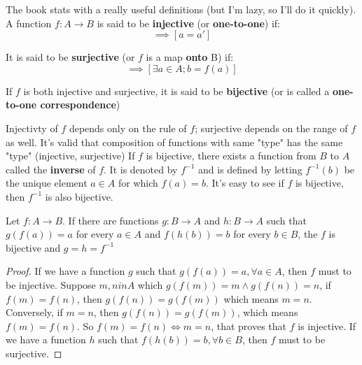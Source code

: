 The book stats with a really useful definitions (but I'm lazy, so I'll do it quickly). A function $f: A \to B$ is said to be \textbf{injective} (or \textbf{one-to-one}) if:
\begin{equation}
  [f(a) = f(a')] \implies [a = a']
\end{equation}

It is said to be \textbf{surjective} (or $f$ is a map \textbf{onto} B) if:
\begin{equation}
  [b \in B] \implies [\exists a \in A; b = f(a)]
\end{equation}

If $f$ is both injective and surjective, it is said to be \textbf{bijective} (or is called a \textbf{one-to-one correspondence})

Injectivty of $f$ depends only on the rule of $f$; surjective depends on the range of $f$ as well. It's valid that composition of functions with same "type" has the same "type" (injective, surjective)
If $f$ is bijective, there exists a function from $B$ to $A$ called the \textbf{inverse} of $f$. It is denoted by $f^{-1}$ and is defined by letting $f^{-1}(b)$ be the unique element $a \in A$ for which $f(a) = b$. It's easy to see if $f$ is bijective, then $f^{-1}$ is also bijective.

\begin{lemma}
  Let $f: A \to B$. If there are functions $g: B \to A$ and $h: B \to A$ such that $g(f(a)) = a$ for every $a \in A$ and $f(h(b)) = b$ for every $b \in B$, the $f$ is bijective and $g = h = f^{-1}$ 
\end{lemma}

\begin{proof}
If we have a function $g$ such that $g(f(a)) = a, \forall a \in A$, then $f$ must to be injective. Suppose $m,n in A$ which $g(f(m)) = m \land g(f(n)) = n$, if $f(m) = f(n)$, then $g(f(n)) = g(f(m))$ which means $m = n$. Conversely, if $m = n$, then $g(f(n)) = g(f(m))$, which means $f(m) = f(n)$. So $f(m) = f(n) \iff m = n$, that proves that $f$ is injective. If we have a function $h$ such that $f(h(b)) = b, \forall b \in B$, then $f$ must to be surjective.  
\end{proof}

